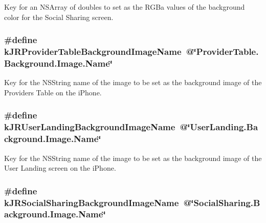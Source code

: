 \label{group__custom_interface_ga6554a101f0e2e9474a77262143dc528b}
Key for an {\ttfamily NSArray} of doubles to set as the RGBa values of the background color for the Social Sharing screen. \hypertarget{group__custom_interface_ga893fb6e20be0c6658e81a6a5d5c121f0}{
\subsubsection[{kJRProviderTableBackgroundImageName}]{\setlength{\rightskip}{0pt plus 5cm}\#define kJRProviderTableBackgroundImageName~@\char`\"{}ProviderTable.Background.Image.Name\char`\"{}}}
\label{group__custom_interface_ga893fb6e20be0c6658e81a6a5d5c121f0}
Key for the {\ttfamily NSString} name of the image to be set as the background image of the Providers Table on the iPhone. \hypertarget{group__custom_interface_gadda3f945ba5012762eb92764b251b918}{
\subsubsection[{kJRUserLandingBackgroundImageName}]{\setlength{\rightskip}{0pt plus 5cm}\#define kJRUserLandingBackgroundImageName~@\char`\"{}UserLanding.Background.Image.Name\char`\"{}}}
\label{group__custom_interface_gadda3f945ba5012762eb92764b251b918}
Key for the {\ttfamily NSString} name of the image to be set as the background image of the User Landing screen on the iPhone. \hypertarget{group__custom_interface_gad2e00942af19ec9478ba58a491a8b8f2}{
\subsubsection[{kJRSocialSharingBackgroundImageName}]{\setlength{\rightskip}{0pt plus 5cm}\#define kJRSocialSharingBackgroundImageName~@\char`\"{}SocialSharing.Background.Image.Name\char`\"{}}}
\label{group__custom_interface_gad2e00942af19ec9478ba58a491a8b8f2}
